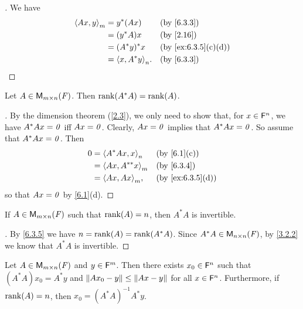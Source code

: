 \begin{proof}[]
  We have
  \begin{align*}
    \inn{Ax, y}_m & = y^* (Ax)          &  & \by{6.3.3}         \\
                  & = (y^* A) x         &  & \by{2.16}          \\
                  & = (A^* y)^* x       &  & \by{ex:6.3.5}[c,d] \\
                  & = \inn{x, A^* y}_n. &  & \by{6.3.3}
  \end{align*}
\end{proof}

\begin{lem}\label{6.3.5}
  Let \(A \in \ms\).
  Then \(\rk{A^* A} = \rk{A}\).
\end{lem}

\begin{proof}[]
  By the dimension theorem (\cref{2.3}), we only need to show that, for \(x \in \mathsf{F}^n\), we have \(A^* Ax = \mathit{0}\) iff \(Ax = \mathit{0}\).
  Clearly, \(Ax = \mathit{0}\) implies that \(A^* Ax = \mathit{0}\).
  So assume that \(A^* Ax = \mathit{0}\).
  Then
  \begin{align*}
    0 & = \inn{A^* Ax, x}_n    &  & \by{6.1}[c]      \\
      & = \inn{Ax, A^{**} x}_m &  & \by{6.3.4}       \\
      & = \inn{Ax, Ax}_m,      &  & \by{ex:6.3.5}[d]
  \end{align*}
  so that \(Ax = \mathit{0}\) by \cref{6.1}(d).
\end{proof}

\begin{cor}\label{6.3.6}
  If \(A \in \ms\) such that \(\rk{A} = n\), then \(A^* A\) is invertible.
\end{cor}

\begin{proof}[]
  By \cref{6.3.5} we have \(n = \rk{A} = \rk{A^* A}\).
  Since \(A^* A \in \ms[n][n][\F]\), by \cref{3.2.2} we know that \(A^* A\) is invertible.
\end{proof}

\begin{thm}\label{6.12}
  Let \(A \in \ms\) and \(y \in \mathsf{F}^m\).
  Then there exists \(x_0 \in \mathsf{F}^n\) such that \((A^* A) x_0 = A^* y\) and \(\left\lVert A x_0 - y\right\rVert \leq \left\lVert Ax - y\right\rVert\) for all \(x \in \mathsf{F}^n\).
  Furthermore, if \(\rk{A} = n\), then \(x_0 = (A^* A)^{-1} A^* y\).
\end{thm}

